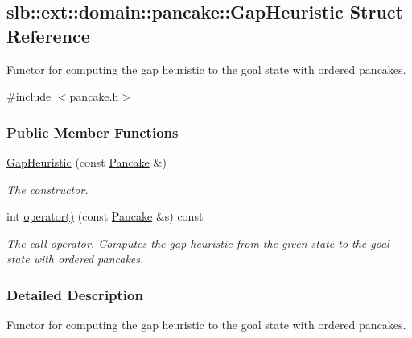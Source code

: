 \hypertarget{structslb_1_1ext_1_1domain_1_1pancake_1_1GapHeuristic}{}\subsection{slb\+:\+:ext\+:\+:domain\+:\+:pancake\+:\+:Gap\+Heuristic Struct Reference}
\label{structslb_1_1ext_1_1domain_1_1pancake_1_1GapHeuristic}


Functor for computing the gap heuristic to the goal state with ordered pancakes.  




{\ttfamily \#include $<$pancake.\+h$>$}

\subsubsection*{Public Member Functions}
\begin{DoxyCompactItemize}
\item 
\hyperlink{structslb_1_1ext_1_1domain_1_1pancake_1_1GapHeuristic_ad9d47e11fc855f38ca746629887c43eb}{Gap\+Heuristic} (const \hyperlink{structslb_1_1ext_1_1domain_1_1pancake_1_1Pancake}{Pancake} \&)\hypertarget{structslb_1_1ext_1_1domain_1_1pancake_1_1GapHeuristic_ad9d47e11fc855f38ca746629887c43eb}{}\label{structslb_1_1ext_1_1domain_1_1pancake_1_1GapHeuristic_ad9d47e11fc855f38ca746629887c43eb}

\begin{DoxyCompactList}\small\item\em The constructor. \end{DoxyCompactList}\item 
int \hyperlink{structslb_1_1ext_1_1domain_1_1pancake_1_1GapHeuristic_aec4b2f568f9f2ba7ebf866ea8b455af4}{operator()} (const \hyperlink{structslb_1_1ext_1_1domain_1_1pancake_1_1Pancake}{Pancake} \&s) const 
\begin{DoxyCompactList}\small\item\em The call operator. Computes the gap heuristic from the given state to the goal state with ordered pancakes. \end{DoxyCompactList}\end{DoxyCompactItemize}


\subsubsection{Detailed Description}
Functor for computing the gap heuristic to the goal state with ordered pancakes. 

